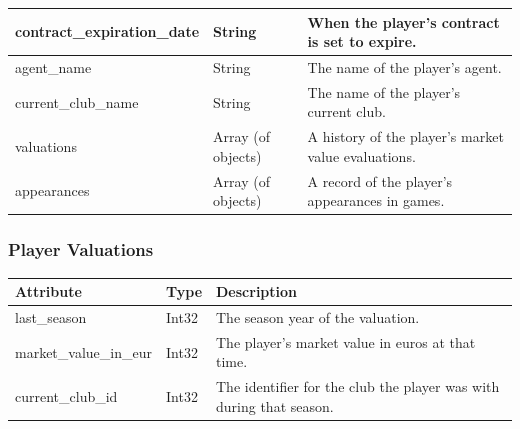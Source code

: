 \documentclass{Configuration_Files/PoliMi3i_thesis}
\begin{document}
\begin{tabular}{|l|l|p{8cm}|}
    contract\_expiration\_date     & String                   & When the player's contract is set to expire. \\ \hline
    agent\_name                    & String                   & The name of the player's agent. \\ \hline
    current\_club\_name            & String                   & The name of the player's current club. \\ \hline
    valuations                     & Array (of objects)       & A history of the player's market value evaluations. \\ \hline
    appearances                    & Array (of objects)       & A record of the player's appearances in games. \\ \hline
    \end{tabular}
\subsubsection{Player Valuations}
\begin{tabular}{|l|l|p{8cm}|}
    \hline
    \rowcolor{bluepoli!40}
    \textbf{Attribute}             & \textbf{Type}           & \textbf{Description} \\ \hline
    last\_season                   & Int32                   & The season year of the valuation. \\ \hline
    market\_value\_in\_eur         & Int32                   & The player's market value in euros at that time. \\ \hline
    current\_club\_id              & Int32                   & The identifier for the club the player was with during that season. \\ \hline
    \end{tabular}
\end{document}
